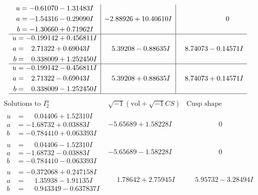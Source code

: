 \documentclass[1p]{elsarticle_modified}
\theoremstyle{definition}
\newcommand{\I}{\sqrt{-1}}
\begin{document}
$$\begin{array}{c|c|c}
\begin{aligned}
u &= -0.61070 - 1.31483 I \\
a &= -1.54316 - 0.29090 I \\
b &= -1.30660 + 0.71962 I\end{aligned}
 & -2.88926 + 10.40610 I & \phantom{-0.000000 } 0 \\ \hline\begin{aligned}
u &= -0.199142 + 0.456811 I \\
a &= \phantom{-}2.71322 + 0.69043 I \\
b &= \phantom{-}0.338009 + 1.252450 I\end{aligned}
 & \phantom{-}5.39208 - 0.88635 I & \phantom{-}8.74073 - 0.14571 I \\ \hline\begin{aligned}
u &= -0.199142 - 0.456811 I \\
a &= \phantom{-}2.71322 - 0.69043 I \\
b &= \phantom{-}0.338009 - 1.252450 I\end{aligned}
 & \phantom{-}5.39208 + 0.88635 I & \phantom{-}8.74073 + 0.14571 I\\
 \hline 
 \end{array}$$\newpage$$\begin{array}{c|c|c}  
\text{Solutions to }I^u_{2}& \I (\text{vol} + \sqrt{-1}CS) & \text{Cusp shape}\\
 \hline 
\begin{aligned}
u &= \phantom{-}0.04406 + 1.52310 I \\
a &= -1.68732 + 0.03883 I \\
b &= -0.784410 + 0.063393 I\end{aligned}
 & -5.65689 + 1.58228 I & \phantom{-0.000000 } 0 \\ \hline\begin{aligned}
u &= \phantom{-}0.04406 - 1.52310 I \\
a &= -1.68732 - 0.03883 I \\
b &= -0.784410 - 0.063393 I\end{aligned}
 & -5.65689 - 1.58228 I & \phantom{-0.000000 } 0 \\ \hline\begin{aligned}
u &= -0.372068 + 0.247158 I \\
a &= \phantom{-}1.35938 - 1.91135 I \\
b &= \phantom{-}0.943349 - 0.637837 I\end{aligned}
 & \phantom{-}1.78642 + 2.75945 I & \phantom{-}5.95732 - 3.28494 I \\ \hline\begin{aligned}

\end{aligned}
\end{array}$$
\end{document}
